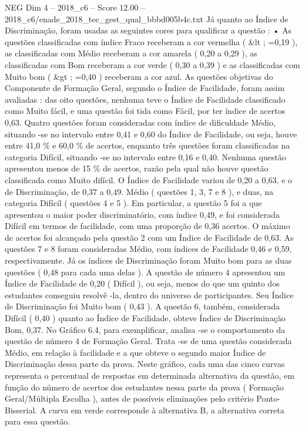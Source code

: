 \begin{textsample}{NEG Dim 4 – 2018\_c6 – Score 12.00 – 2018\_c6/enade\_2018\_tec\_gest\_qual\_bbbd005b4c.txt}
Já quanto ao Índice de Discriminação, foram usadas as seguintes cores para qualificar a questão : • As questões classificadas com índice Fraco receberam a cor vermelha ( \&lt ; =0,19 ), as classificadas com Médio receberam a cor amarela ( 0,20 a 0,29 ), as classificadas com Bom receberam a cor verde ( 0,30 a 0,39 ) e as classificadas com Muito bom ( \&gt ; =0,40 ) receberam a cor azul.
As questões objetivas do Componente de Formação Geral, segundo o Índice de Facilidade, foram assim avaliadas : das oito questões, nenhuma teve o Índice de Facilidade classificado como Muito fácil, e uma questão foi tida como Fácil, por ter índice de acertos 0,63.
Quatro questões foram consideradas com índice de dificuldade Médio, situando -se no intervalo entre 0,41 e 0,60 do Índice de Facilidade, ou seja, houve entre 41,0 \% e 60,0 \% de acertos, enquanto três questões foram classificadas na categoria Difícil, situando -se no intervalo entre 0,16 e 0,40.
Nenhuma questão apresentou menos de 15 \% de acertos, razão pela qual não houve questão classificada como Muito difícil.
O Índice de Facilidade variou de 0,20 a 0,63, e o de Discriminação, de 0,37 a 0,49.
Médio ( questões 1, 3, 7 e 8 ), e duas, na categoria Difícil ( questões 4 e 5 ).
Em particular, a questão 5 foi a que apresentou o maior poder discriminatório, com índice 0,49, e foi considerada Difícil em termos de facilidade, com uma proporção de 0,36 acertos.
O máximo de acertos foi alcançado pela questão 2 com um Índice de Facilidade de 0,63.
As questões 7 e 8 foram consideradas Médio, com índices de Facilidade 0,46 e 0,59, respectivamente.
Já os índices de Discriminação foram Muito bom para as duas questões ( 0,48 para cada uma delas ).
A questão de número 4 apresentou um Índice de Facilidade de 0,20 ( Difícil ), ou seja, menos do que um quinto dos estudantes conseguiu resolvê -la, dentro do universo de participantes.
Seu Índice de Discriminação foi Muito bom ( 0,43 ).
A questão 6, também, considerada Difícil ( 0,40 ) quanto ao Índice de Facilidade, obteve Índice de Discriminação Bom, 0,37.
No Gráfico 6.4, para exemplificar, analisa -se o comportamento da questão de número 4 de Formação Geral.
Trata -se de uma questão considerada Médio, em relação à facilidade e a que obteve o segundo maior Índice de Discriminação dessa parte da prova.
Neste gráfico, cada uma das cinco curvas representa o percentual de respostas em determinada alternativa da questão, em função do número de acertos dos estudantes nessa parte da prova ( Formação Geral/Múltipla Escolha ), antes de possíveis eliminações pelo critério Ponto-Bisserial.
A curva em verde corresponde à alternativa B, a alternativa correta para essa questão.

\end{textsample}
